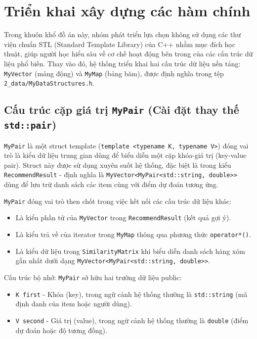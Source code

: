 \documentclass{report}
\begin{document}
\section{Triển khai xây dựng các hàm chính}

Trong khuôn khổ đồ án này, nhóm phát triển lựa chọn không sử dụng các thư viện chuẩn STL (Standard Template Library) của C++ nhằm mục đích học thuật, giúp người học hiểu sâu về cơ chế hoạt động bên trong của các cấu trúc dữ liệu phổ biến. Thay vào đó, hệ thống triển khai hai cấu trúc dữ liệu nền tảng: \texttt{MyVector} (mảng động) và \texttt{MyMap} (bảng băm), được định nghĩa trong tệp \texttt{2\_data/MyDataStructures.h}.

\subsection{Cấu trúc cặp giá trị \texttt{MyPair} (Cài đặt thay thế \texttt{std::pair})}

\texttt{MyPair} là một struct template (\texttt{template <typename K, typename V>}) đóng vai trò là kiểu dữ liệu trung gian dùng để biểu diễn một cặp khóa-giá trị (key-value pair). Struct này được sử dụng xuyên suốt hệ thống, đặc biệt là trong kiểu \texttt{RecommendResult} - định nghĩa là \texttt{MyVector<MyPair<std::string, double>>} dùng để lưu trữ danh sách các item cùng với điểm dự đoán tương ứng.

\texttt{MyPair} đóng vai trò then chốt trong việc kết nối các cấu trúc dữ liệu khác:
\begin{itemize}
    \item Là kiểu phần tử của \texttt{MyVector} trong \texttt{RecommendResult} (kết quả gợi ý).
    \item Là kiểu trả về của iterator trong \texttt{MyMap} thông qua phương thức \texttt{operator*()}.
    \item Là kiểu dữ liệu trong \texttt{SimilarityMatrix} khi biểu diễn danh sách hàng xóm gần nhất dưới dạng \texttt{MyVector<MyPair<std::string, double>>}.
\end{itemize}

Cấu trúc bộ nhớ: \texttt{MyPair} sở hữu hai trường dữ liệu public:
\begin{itemize}
    \item \texttt{K first} - Khóa (key), trong ngữ cảnh hệ thống thường là \texttt{std::string} (mã định danh của item hoặc người dùng).
    \item \texttt{V second} - Giá trị (value), trong ngữ cảnh hệ thống thường là \texttt{double} (điểm dự đoán hoặc độ tương đồng).
\end{itemize}
\end{document}
